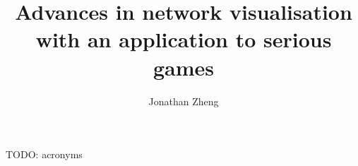 \documentclass[a4paper,12pt,twoside]{report}
\begin{document}
\title{\LARGE {\bf Advances in network visualisation with an application to serious games}\\
 \vspace*{6mm}
}

\author{Jonathan Zheng}

\normallinespacing
\maketitle

\preface




TODO: acronyms

\body








\appendix




\end{document}
